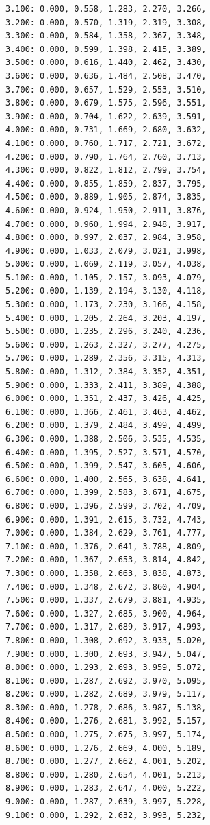 \documentclass[12pt, a4paper]{article}
\begin{document}
\begin{scriptsize}
\begin{ttfamily}
\begin{lstlisting}
3.100: 0.000, 0.558, 1.283, 2.270, 3.266, 
3.200: 0.000, 0.570, 1.319, 2.319, 3.308, 
3.300: 0.000, 0.584, 1.358, 2.367, 3.348, 
3.400: 0.000, 0.599, 1.398, 2.415, 3.389, 
3.500: 0.000, 0.616, 1.440, 2.462, 3.430, 
3.600: 0.000, 0.636, 1.484, 2.508, 3.470, 
3.700: 0.000, 0.657, 1.529, 2.553, 3.510, 
3.800: 0.000, 0.679, 1.575, 2.596, 3.551, 
3.900: 0.000, 0.704, 1.622, 2.639, 3.591, 
4.000: 0.000, 0.731, 1.669, 2.680, 3.632, 
4.100: 0.000, 0.760, 1.717, 2.721, 3.672, 
4.200: 0.000, 0.790, 1.764, 2.760, 3.713, 
4.300: 0.000, 0.822, 1.812, 2.799, 3.754, 
4.400: 0.000, 0.855, 1.859, 2.837, 3.795, 
4.500: 0.000, 0.889, 1.905, 2.874, 3.835, 
4.600: 0.000, 0.924, 1.950, 2.911, 3.876, 
4.700: 0.000, 0.960, 1.994, 2.948, 3.917, 
4.800: 0.000, 0.997, 2.037, 2.984, 3.958, 
4.900: 0.000, 1.033, 2.079, 3.021, 3.998, 
5.000: 0.000, 1.069, 2.119, 3.057, 4.038, 
5.100: 0.000, 1.105, 2.157, 3.093, 4.079, 
5.200: 0.000, 1.139, 2.194, 3.130, 4.118, 
5.300: 0.000, 1.173, 2.230, 3.166, 4.158, 
5.400: 0.000, 1.205, 2.264, 3.203, 4.197, 
5.500: 0.000, 1.235, 2.296, 3.240, 4.236, 
5.600: 0.000, 1.263, 2.327, 3.277, 4.275, 
5.700: 0.000, 1.289, 2.356, 3.315, 4.313, 
5.800: 0.000, 1.312, 2.384, 3.352, 4.351, 
5.900: 0.000, 1.333, 2.411, 3.389, 4.388, 
6.000: 0.000, 1.351, 2.437, 3.426, 4.425, 
6.100: 0.000, 1.366, 2.461, 3.463, 4.462, 
6.200: 0.000, 1.379, 2.484, 3.499, 4.499, 
6.300: 0.000, 1.388, 2.506, 3.535, 4.535, 
6.400: 0.000, 1.395, 2.527, 3.571, 4.570, 
6.500: 0.000, 1.399, 2.547, 3.605, 4.606, 
6.600: 0.000, 1.400, 2.565, 3.638, 4.641, 
6.700: 0.000, 1.399, 2.583, 3.671, 4.675, 
6.800: 0.000, 1.396, 2.599, 3.702, 4.709, 
6.900: 0.000, 1.391, 2.615, 3.732, 4.743, 
7.000: 0.000, 1.384, 2.629, 3.761, 4.777, 
7.100: 0.000, 1.376, 2.641, 3.788, 4.809, 
7.200: 0.000, 1.367, 2.653, 3.814, 4.842, 
7.300: 0.000, 1.358, 2.663, 3.838, 4.873, 
7.400: 0.000, 1.348, 2.672, 3.860, 4.904, 
7.500: 0.000, 1.337, 2.679, 3.881, 4.935, 
7.600: 0.000, 1.327, 2.685, 3.900, 4.964, 
7.700: 0.000, 1.317, 2.689, 3.917, 4.993, 
7.800: 0.000, 1.308, 2.692, 3.933, 5.020, 
7.900: 0.000, 1.300, 2.693, 3.947, 5.047, 
8.000: 0.000, 1.293, 2.693, 3.959, 5.072, 
8.100: 0.000, 1.287, 2.692, 3.970, 5.095, 
8.200: 0.000, 1.282, 2.689, 3.979, 5.117, 
8.300: 0.000, 1.278, 2.686, 3.987, 5.138, 
8.400: 0.000, 1.276, 2.681, 3.992, 5.157, 
8.500: 0.000, 1.275, 2.675, 3.997, 5.174, 
8.600: 0.000, 1.276, 2.669, 4.000, 5.189, 
8.700: 0.000, 1.277, 2.662, 4.001, 5.202, 
8.800: 0.000, 1.280, 2.654, 4.001, 5.213, 
8.900: 0.000, 1.283, 2.647, 4.000, 5.222, 
9.000: 0.000, 1.287, 2.639, 3.997, 5.228, 
9.100: 0.000, 1.292, 2.632, 3.993, 5.232, 

\end{lstlisting}
\end{ttfamily}
\end{scriptsize}
\end{document}

